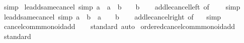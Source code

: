 \begin{isabellebody}
\ simp%
\endisatagproof
{\isafoldproof}%
%
\isadelimproof
\isanewline
%
\endisadelimproof
\isanewline
{}\isamarkupfalse%
\ le{\isacharunderscore}{\kern0pt}add{\isacharunderscore}{\kern0pt}same{\isacharunderscore}{\kern0pt}cancel{}\ {\isacharbrackleft}{\kern0pt}simp{\isacharbrackright}{\kern0pt}{\isacharcolon}{\kern0pt}\ {\isachardoublequoteopen}a\ {\isasymle}\ a\ {\isacharplus}{\kern0pt}\ b\ {\isasymlongleftrightarrow}\ {}\ {\isasymle}\ b{\isachardoublequoteclose}\isanewline
%
\isadelimproof
\ \ %
\endisadelimproof
%
\isatagproof
{}\isamarkupfalse%
\ add{\isacharunderscore}{\kern0pt}le{\isacharunderscore}{\kern0pt}cancel{\isacharunderscore}{\kern0pt}left\ {\isacharbrackleft}{\kern0pt}of\ {\isacharunderscore}{\kern0pt}\ {}{\isacharbrackright}{\kern0pt}\ \isamarkupfalse%
\ simp%
\endisatagproof
{\isafoldproof}%
%
\isadelimproof
\isanewline
%
\endisadelimproof
\isanewline
{}\isamarkupfalse%
\ le{\isacharunderscore}{\kern0pt}add{\isacharunderscore}{\kern0pt}same{\isacharunderscore}{\kern0pt}cancel{}\ {\isacharbrackleft}{\kern0pt}simp{\isacharbrackright}{\kern0pt}{\isacharcolon}{\kern0pt}\ {\isachardoublequoteopen}a\ {\isasymle}\ b\ {\isacharplus}{\kern0pt}\ a\ {\isasymlongleftrightarrow}\ {}\ {\isasymle}\ b{\isachardoublequoteclose}\isanewline
%
\isadelimproof
\ \ %
\endisadelimproof
%
\isatagproof
{}\isamarkupfalse%
\ add{\isacharunderscore}{\kern0pt}le{\isacharunderscore}{\kern0pt}cancel{\isacharunderscore}{\kern0pt}right\ {\isacharbrackleft}{\kern0pt}of\ {}{\isacharbrackright}{\kern0pt}\ \isamarkupfalse%
\ simp%
\endisatagproof
{\isafoldproof}%
%
\isadelimproof
\isanewline
%
\endisadelimproof
\isanewline
{}\isamarkupfalse%
\ cancel{\isacharunderscore}{\kern0pt}comm{\isacharunderscore}{\kern0pt}monoid{\isacharunderscore}{\kern0pt}add\isanewline
%
\isadelimproof
\ \ %
\endisadelimproof
%
\isatagproof
{}\isamarkupfalse%
\ standard\ auto%
\endisatagproof
{\isafoldproof}%
%
\isadelimproof
\isanewline
%
\endisadelimproof
\isanewline
{}\isamarkupfalse%
\ ordered{\isacharunderscore}{\kern0pt}cancel{\isacharunderscore}{\kern0pt}comm{\isacharunderscore}{\kern0pt}monoid{\isacharunderscore}{\kern0pt}add\isanewline
%
\isadelimproof
\ \ %
\endisadelimproof
%
\isatagproof
{}\isamarkupfalse%
\ standard%
\endisatagproof
{\isafoldproof}%
%
\isadelimproof
\isanewline
%
\endisadelimproof
\isanewline
{}\isamarkupfalse%
\isanewline
\isanewline

\end{isabellebody}
